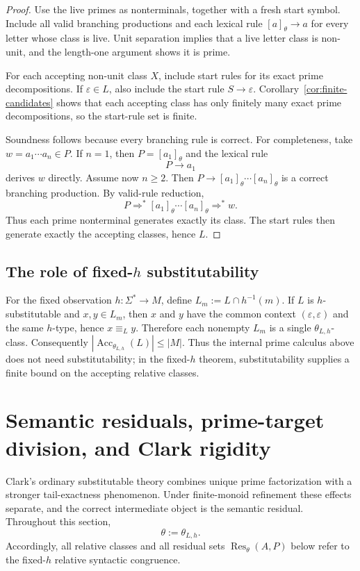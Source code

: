 \documentclass[11pt,a4paper]{article}
\newcommand{\eps}{\varepsilon}
\newcommand{\Acc}{\operatorname{Acc}}
\begin{document}
\begin{proof}
Use the live primes as nonterminals, together with a fresh start symbol.  Include all valid branching productions and each lexical rule $[a]_\theta\to a$ for every letter whose class is live.  Unit separation implies that a live letter class is non-unit, and the length-one argument shows it is prime.

For each accepting non-unit class $X$, include start rules for its exact prime decompositions.  If $\eps\in L$, also include the start rule
\(S\to\eps.\)
Corollary~\ref{cor:finite-candidates} shows that each accepting class has only finitely many exact prime decompositions, so the start-rule set is finite.

Soundness follows because every branching rule is correct.  For completeness, take $w=a_1\cdots a_n\in P$.  If $n=1$, then $P=[a_1]_\theta$ and the lexical rule
\[
  P\to a_1
\]
derives $w$ directly.  Assume now $n\ge2$.  Then
\(P\to[a_1]_\theta\cdots[a_n]_\theta\)
is a correct branching production.  By valid-rule reduction,
\[
  P\Rightarrow^*[a_1]_\theta\cdots[a_n]_\theta\Rightarrow^*w.
\]
Thus each prime nonterminal generates exactly its class.  The start rules then generate exactly the accepting classes, hence $L$.
\end{proof}

\subsection{The role of fixed-\texorpdfstring{$h$}{h} substitutability}

For the fixed observation $h:\Sigma^*\to M$, define
\(L_m:=L\cap h^{-1}(m).\)
If $L$ is $h$-substitutable and $x,y\in L_m$, then $x$ and $y$ have the common context $(\eps,\eps)$ and the same $h$-type, hence $x\equiv_L y$.  Therefore each nonempty $L_m$ is a single $\theta_{L,h}$-class.  Consequently
\(|\Acc_{\theta_{L,h}}(L)|\le |M|.\)
Thus the internal prime calculus above does not need substitutability; in the fixed-$h$ theorem, substitutability supplies a finite bound on the accepting relative classes.

\section{Semantic residuals, prime-target division, and Clark rigidity}
\label{sec:residual-ptld}

Clark's ordinary substitutable theory combines unique prime factorization with a stronger tail-exactness phenomenon.  Under finite-monoid refinement these effects separate, and the correct intermediate object is the semantic residual.  Throughout this section,
\[
  \theta:=\theta_{L,h}.
\]
Accordingly, all relative classes and all residual sets $\operatorname{Res}_\theta(A,P)$ below refer to the fixed-$h$ relative syntactic congruence.
\end{document}
